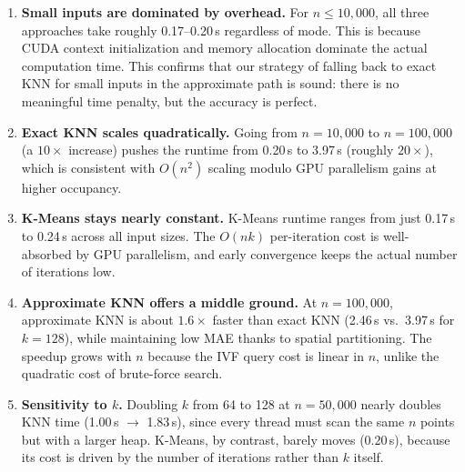 \documentclass[11pt,a4paper]{article}
\begin{document}
\begin{enumerate}[leftmargin=*]
\item \textbf{Small inputs are dominated by overhead.}
For $n \leq 10{,}000$, all three approaches take roughly 0.17--0.20\,s regardless of mode. This is because CUDA context initialization and memory allocation dominate the actual computation time.
This confirms that our strategy of falling back to exact KNN for small inputs in the approximate path is sound: there is no meaningful time penalty, but the accuracy is perfect.

\item \textbf{Exact KNN scales quadratically.}
Going from $n = 10{,}000$ to $n = 100{,}000$ (a $10\times$ increase) pushes the runtime from 0.20\,s to 3.97\,s (roughly $20\times$), which is consistent with $O(n^2)$ scaling modulo GPU parallelism gains at higher occupancy.

\item \textbf{K-Means stays nearly constant.}
K-Means runtime ranges from just 0.17\,s to 0.24\,s across all input sizes. The $O(nk)$ per-iteration cost is well-absorbed by GPU parallelism, and early convergence keeps the actual number of iterations low.

\item \textbf{Approximate KNN offers a middle ground.}
At $n = 100{,}000$, approximate KNN is about $1.6\times$ faster than exact KNN (2.46\,s vs.\ 3.97\,s for $k = 128$), while maintaining low MAE thanks to spatial partitioning. The speedup grows with $n$ because the IVF query cost is linear in $n$, unlike the quadratic cost of brute-force search.

\item \textbf{Sensitivity to $k$.}
Doubling $k$ from 64 to 128 at $n = 50{,}000$ nearly doubles KNN time (1.00\,s $\to$ 1.83\,s), since every thread must scan the same $n$ points but with a larger heap.
K-Means, by contrast, barely moves (0.20\,s), because its cost is driven by the number of iterations rather than $k$ itself.
\end{enumerate}
\end{document}
